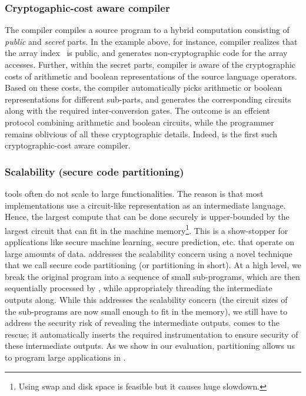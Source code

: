 \subsubsection*{Cryptogaphic-cost aware compiler} The \tool compiler
compiles a source program to a hybrid computation consisting
of \emph{public} and \emph{secret} parts. In the example above, for
instance, \tool compiler realizes that the array index~ is
public, and generates non-cryptographic code for the array accesses.
Further, within the secret parts, \tool compiler is
aware
of the cryptographic costs of arithmetic and boolean representations
of the source language operators. Based on these costs, the compiler
automatically picks arithmetic or boolean
representations for different sub-parts, and generates the
corresponding circuits along with the required inter-conversion
gates. The outcome is an effcient \mpc protocol combining arithmetic
and boolean circuits, while the programmer remains
oblivious of all these cryptographic details. Indeed, \tool is the
first such cryptographic-cost aware compiler.

\subsubsection*{Scalability (secure code partitioning)} \mpc tools
often do not scale to large functionalities. The reason is that
most \mpc implementations use a circuit-like representation as an
intermediate language. Hence, the largest compute that can be done
securely is upper-bounded by the largest circuit that can fit in the
machine memory\footnote{Using swap and
disk space is feasible but it causes huge slowdown.}. This is a
show-stopper for applications like secure machine learning, secure
prediction, etc. that operate on large amounts of data.
\tool addresses the scalability concern using a novel technique that
we call secure code partitioning (or partitioning in short). At
a high level, we break the original program into a sequence of small
sub-programs, which are then sequentially processed by \tool, while
appropriately threading the intermediate outputs
along. While this
addresses the scalability concern (the circuit
sizes of the sub-programs are now small enough to fit in the memory),
we still have to address
the security risk of revealing the intermediate outputs. \tool comes
to the rescue; it automatically inserts the required instrumentation
to ensure security of these intermediate outputs. As
we show in our
evaluation, partitioning allows us to program large applications
in \tool.

